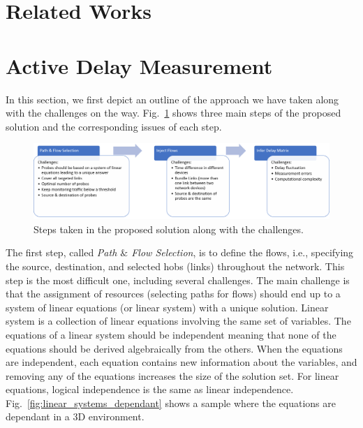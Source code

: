 \documentclass[10pt, journal, letterpaper]{IEEEtran}
\begin{document}
\section{Related Works}

\section{Active Delay Measurement}
In this section, we first depict an outline of the approach we have taken along with the challenges on the way. Fig.~\ref{fig:challenges} shows three main steps of the proposed solution and the corresponding issues of each step. 
\begin{figure}
    \centering
    \includegraphics[width=\linewidth]{img/Challenges.png}
    \caption{Steps taken in the proposed solution along with the challenges.}
    \label{fig:challenges}
\end{figure}
The first step, called \textit{Path $\&$ Flow Selection}, is to define the flows, i.e., specifying the source, destination, and selected hobs (links) throughout the network. This step is the most difficult one, including several challenges. The main challenge is that the assignment of resources (selecting paths for flows) should end up to a system of linear equations (or linear system) with a unique solution. Linear system is a collection of linear equations involving the same set of variables. The equations of a linear system should be independent meaning that none of the equations should be derived algebraically from the others. When the equations are independent, each equation contains new information about the variables, and removing any of the equations increases the size of the solution set. For linear equations, logical independence is the same as linear independence. Fig.~\ref{fig:linear_systems_dependant} shows a sample where the equations are dependant in a 3D environment.
\end{document}
